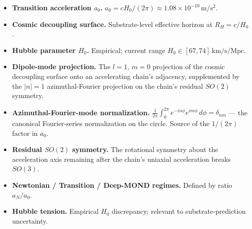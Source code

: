 \documentclass[11pt,a4paper]{article}
\begin{document}
\begin{itemize}[noitemsep]
\item \textbf{Transition acceleration $a_0$.} $a_0 = cH_0/(2\pi) \approx 1.08 \times 10^{-10}\,\mathrm{m/s^2}$.
\item \textbf{Cosmic decoupling surface.} Substrate-level effective horizon at $R_H = c/H_0$.
\item \textbf{Hubble parameter $H_0$.} Empirical; current range $H_0 \in [67, 74]\,\mathrm{km/s/Mpc}$.
\item \textbf{Dipole-mode projection.} The $l=1$, $m=0$ projection of the cosmic decoupling surface onto an accelerating chain's adjacency, supplemented by the $|n|=1$ azimuthal-Fourier projection on the chain's residual $SO(2)$ symmetry.
\item \textbf{Azimuthal-Fourier-mode normalization.} $\frac{1}{2\pi}\int_0^{2\pi}e^{-in\phi}e^{im\phi}\,d\phi = \delta_{nm}$ --- the canonical Fourier-series normalization on the circle. Source of the $1/(2\pi)$ factor in $a_0$.
\item \textbf{Residual $SO(2)$ symmetry.} The rotational symmetry about the acceleration axis remaining after the chain's uniaxial acceleration breaks $SO(3)$.
\item \textbf{Newtonian / Transition / Deep-MOND regimes.} Defined by ratio $a_N/a_0$.
\item \textbf{Hubble tension.} Empirical $H_0$ discrepancy; relevant to substrate-prediction uncertainty.
\end{itemize}
\end{document}
